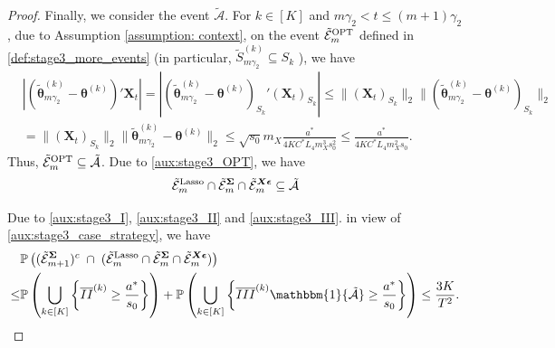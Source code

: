 \documentclass[aos,preprint]{imsart}
\theoremstyle{plain}
\theoremstyle{definition}
\newcommand{\btheta}{\boldsymbol{\theta}}
\newcommand{\bd}[1]{\boldsymbol{#1}}
\newcommand{\idf}{\mathbbm{1}}
\newcommand{\bX}{\boldsymbol{X}}
\newcommand{\bSigma}{\boldsymbol{\Sigma}}
\newcommand{\tbtheta}{\widetilde{\boldsymbol{\theta}}}
\newcommand{\tS}{\tilde{S}}
\newcommand{\mE}{\mathcal{E}}
\newcommand{\bepsilon}{\bd{\epsilon}}
\newcommand{\cA}{\mathcal{A}}
\newcommand{\Pro}{\mathbb{P}}
\begin{document}
\begin{appendix}
\begin{proof}
Finally, we consider the event $\tilde{\cA}$.
For $k\in[K]$ and $m\gamma_2< t \le (m+1)\gamma_2$,  due to Assumption \ref{assumption: context}, on the event $\tilde{\mE}_m^{\textup{OPT}}$ defined in \eqref{def:stage3_more_events} (in particular, $\tS_{m\gamma_2}^{(k)}\subseteq S_k$ ), we have
\begin{align*}
   & |(\tbtheta_{m\gamma_2}^{(k)}-\btheta^{(k)})'\bX_t| = |(\tbtheta_{m\gamma_2}^{(k)}-\btheta^{(k)})_{S_k}' (\bX_t)_{S_k}| \le \|(\bX_t)_{S_k}\|_2 \|(\tbtheta_{m\gamma_2}^{(k)}-\btheta^{(k)})_{S_k} \|_2
    \\&= \|(\bX_t)_{S_k}\|_2 \|\tbtheta_{m\gamma_2}^{(k)}-\btheta^{(k)} \|_2
    \le \sqrt{s_0} m_X \frac{a^*}{4KC^*L_4 m_X^3 s_0^2}\le   \frac{a^*}{4KC^*L_4 m_X^2 s_0}.
\end{align*}
Thus,   $ \tilde{\mE}_m^{\textup{OPT}} \subseteq \tilde{\mathcal{A}}$.  Due to \eqref{aux:stage3_OPT}, we have
$$
\tilde{\mE}_{m}^{\textup{Lasso}} \cap \tilde{\mE}_{m}^{\bSigma}  \cap \tilde{\mE}_{m}^{\bX\bepsilon}  \subseteq \tilde{\cA}
$$

 
Due to \eqref{aux:stage3_I},  \eqref{aux:stage3_II} and  \eqref{aux:stage3_III}. in view of \eqref{aux:stage3_case_strategy}, we have
\begin{align}\label{aux:stage3_step4}
\begin{split}
        &\Pro\left( (\tilde{\mE}_{m+1}^{\bSigma})^c\; \cap \;  (\tilde{\mE}_{m}^{\textup{Lasso}} \cap \tilde{\mE}_{m}^{\bSigma}  \cap \tilde{\mE}_{m}^{\bX\bepsilon} )  \right) \\
    \leq
    &\Pro\left( \bigcup_{k \in [K]} \left\{ \overline{II}^{(k)}  \geq \frac{a^*}{s_0}\right\} \right) + \Pro\left(\bigcup_{k \in [K]} \left\{\overline{III}^{(k)} \idf\{\tilde{\cA}\} \geq\frac{a^*}{ s_0}\right\}\right) \leq \frac{3K}{T^2}.
    \end{split}
 \end{align}

 

 



\end{proof}
\end{appendix}
\end{document}
